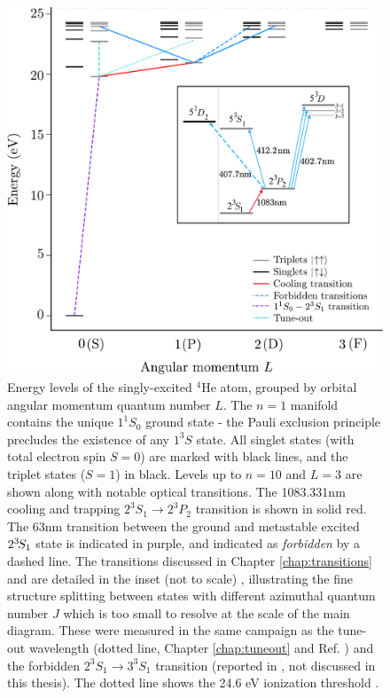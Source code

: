 	\begin{figure}
		\includegraphics[width=\textwidth]{fig/introduction/full_lvl_diag.pdf}
		\caption{Energy levels of the singly-excited $^4$He atom, grouped by orbital angular momentum quantum number $L$. The $n=1$ manifold contains the unique $1^{1\!}S_0$ ground state - the Pauli exclusion principle precludes the existence of any $1^{3\!}S$ state. All singlet states (with total electron spin $S=0$) are marked with black lines, and the triplet states ($S=1$) in black. Levels up to $n=10$ and $L=3$ are shown along with notable optical transitions. The 1083.331nm cooling and trapping $2^{3\!}S_1\rightarrow2^{3\!}P_2$ transition is shown in solid red. The $63$nm transition between the ground and metastable excited $2^{3\!}S_1$ state is indicated in purple, and indicated as \emph{forbidden} by a dashed line. The transitions discussed in Chapter \ref{chap:transitions} and \cite{Ross20} are detailed in the inset (not to scale) , illustrating the fine structure splitting between states with different azimuthal quantum number $J$ which is too small to resolve at the scale of the main diagram. These were measured in the same campaign as the tune-out wavelength (dotted line, Chapter \ref{chap:tuneout} and Ref. \cite{Henson22}) and the forbidden $2^{3\!}S_1\rightarrow3^{3\!}S_1$ transition (reported in \cite{Thomas20}, not discussed in this thesis). The dotted line shows the 24.6 eV ionization threshold \cite{Drake07}.}
		\label{fig:full_level_diagram}
	\end{figure}

